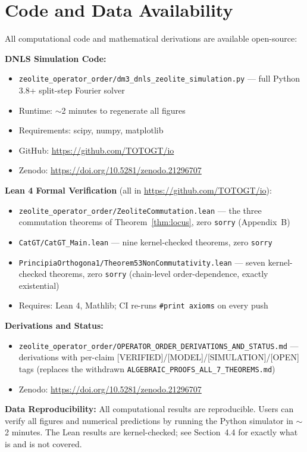 \documentclass[11pt]{article}
\begin{document}
\section{Code and Data Availability}

All computational code and mathematical derivations are available open-source:

\noindent\textbf{DNLS Simulation Code:}
\begin{itemize}[itemsep=1pt]
\item \texttt{zeolite\_operator\_order/dm3\_dnls\_zeolite\_simulation.py} --- full Python 3.8+ split-step Fourier solver
\item Runtime: $\sim$2 minutes to regenerate all figures
\item Requirements: scipy, numpy, matplotlib
\item GitHub: \url{https://github.com/TOTOGT/io}
\item Zenodo: \url{https://doi.org/10.5281/zenodo.21296707}
\end{itemize}

\noindent\textbf{Lean 4 Formal Verification} (all in \url{https://github.com/TOTOGT/io}):
\begin{itemize}[itemsep=1pt]
\item \texttt{zeolite\_operator\_order/ZeoliteCommutation.lean} --- the three commutation theorems of Theorem~\ref{thm:locus}, zero \texttt{sorry} (Appendix~B)
\item \texttt{CatGT/CatGT\_Main.lean} --- nine kernel-checked theorems, zero \texttt{sorry}
\item \texttt{PrincipiaOrthogona1/Theorem53NonCommutativity.lean} --- seven kernel-checked theorems, zero \texttt{sorry} (chain-level order-dependence, exactly existential)
\item Requires: Lean 4, Mathlib; CI re-runs \texttt{\#print axioms} on every push
\end{itemize}

\noindent\textbf{Derivations and Status:}
\begin{itemize}[itemsep=1pt]
\item \texttt{zeolite\_operator\_order/OPERATOR\_ORDER\_DERIVATIONS\_AND\_STATUS.md} --- derivations with per-claim [VERIFIED]/[MODEL]/[SIMULATION]/[OPEN] tags (replaces the withdrawn \texttt{ALGEBRAIC\_PROOFS\_ALL\_7\_THEOREMS.md})
\item Zenodo: \url{https://doi.org/10.5281/zenodo.21296707}
\end{itemize}

\noindent\textbf{Data Reproducibility:} All computational results are reproducible. Users can verify all figures and numerical predictions by running the Python simulator in $\sim$2 minutes. The Lean results are kernel-checked; see Section~4.4 for exactly what is and is not covered.
\end{document}
